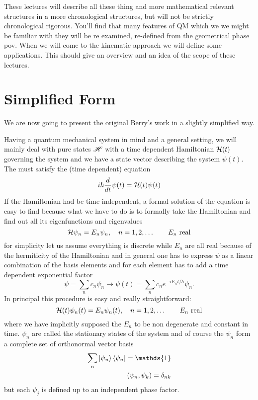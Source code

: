 These lectures will describe all these thing and more mathematical relevant structures in a more chronological structures, but will not be strictly chronological rigorous. You'll find that many features of QM which we we might be familiar with they will be re examined, re-defined from the geometrical phase pov. When we will come to the kinematic approach we will define some applications. This should give an overview and an idea of the scope of these lectures.   
\section{Simplified Form}
We are now going to present the original Berry's work in a slightly simplified way. 

Having a quantum mechanical system in mind and a general setting, we will mainly deal with pure states $ \mathscr{H} $ with a time dependent Hamiltonian $ \mathcal{H}(t) $ governing the system and we have a state vector describing the system $ \psi(t) $.
The \wf must satisfy the (time dependent) \Sch equation 
\begin{equation}
i\hbar \frac{d}{dt}\psi(t)=\mathcal{H}(t)\psi(t)
\label{eq:2.1}
\end{equation}
If the Hamiltonian had be time independent, a formal solution of the \Sch equation is easy to find because what we have to do is to formally take the Hamiltonian and find out all its eigenfunctions and eigenvalues
\begin{equation}
\mathcal{H} \psi_n=E_n\psi_n, \quad n=1,2,\dots \qquad E_n \text{ real} 
\end{equation}
for simplicity let us assume everything is discrete while $ E_n $ are all real because of the hermiticity of the Hamiltonian and in general one has to express $ \psi $ as a linear combination of the basis elements and for each element has to add a time dependent exponential factor
\begin{equation}
\psi=\sum_n c_n\psi_n\to \psi(t)=\sum_n c_n e^{-iE_nt/\hbar}\psi_n.
\end{equation}
In principal this procedure is easy and really straightforward:
\begin{equation}
\mathcal{H}(t)\psi_n(t)=E_n\psi_n(t), \quad n=1,2,\dots \qquad E_n \text{ real}
\end{equation}
where we have implicitly supposed the $ E_n $ to be non degenerate and constant in time. $ \psi_n $ are called the stationary states of the system and of course the $ \psi_n $ form a complete set of orthonormal vector basis
\begin{align}
	\sum_n \Ket{\psi_n}\Bra{\psi_n}=\mathds{1}\\
	\left(\psi_n,\psi_k\right) = \delta_{nk}
\end{align}
but each $ \psi_j $ is defined up to an independent phase factor.

